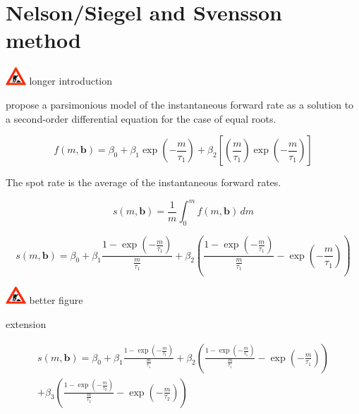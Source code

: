 \section{Nelson/Siegel and Svensson method}
\label{sec:nels-svenss-meth}

\includegraphics[width=0.3in]{baustelle} longer introduction

\cite{Nelson1987} propose a parsimonious  model of  the instantaneous forward rate as a solution to a second-order differential equation for the case of equal roots.

\begin{equation}
  \label{eq:laguerre}
  f(m,\bm{b}) = \beta_0+\beta_1\exp\left(-\frac{m}{\tau_1}\right)+\beta_2\left[\left(\frac{m}{\tau_1}\right)\exp\left(-\frac{m}{\tau_1}\right)\right]
\end{equation}


The spot rate is the average of the instantaneous forward rates. 

\begin{equation}
  \label{eq:intspotrate}
  s(m,\bm{b})=\frac{1}{m}\int_0^mf(m,\bm{b})\,dm
\end{equation}


\begin{equation}
  \label{eq:nelson-spot}
   s(m,\bm{b}) = \beta_0 + \beta_1\frac{1-\exp(-\frac{m}{\tau_1})}{\frac{m}{\tau_1}} + \beta_2\left(\frac{1-\exp(-\frac{m}{\tau_1})}{\frac{m}{\tau_1}} - \exp(-\frac{m}{\tau_1})\right)
\end{equation}

\includegraphics[width=0.3in]{baustelle} better figure

 
\cite{Svensson1994} extension


\begin{multline}\label{eq:svensson-spot}
    s(m,\bm{b}) = \beta_0 + \beta_1\frac{1-\exp(-\frac{m}{\tau_1})}{\frac{m}{\tau_1}} + \beta_2\left(\frac{1-\exp(-\frac{m}{\tau_1})}{\frac{m}{\tau_1}} - \exp(-\frac{m}{\tau_1})\right) \\+ \beta_3\left(\frac{1-\exp(-\frac{m}{\tau_2})}{\frac{m}{\tau_2}} - \exp(-\frac{m}{\tau_2})\right)
\end{multline}



